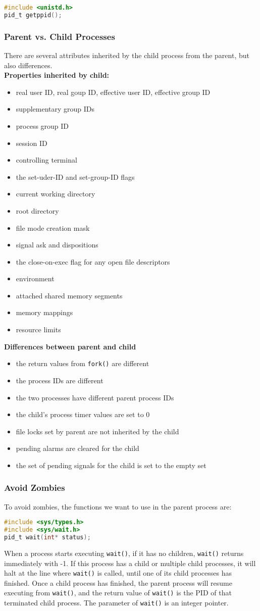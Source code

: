 \documentclass{article}
\newcommand{\bold}[1]{\textbf{#1}}
\renewcommand{\b}{\item[$\circ$]}
\newcommand{\newlist}{\begin{itemize}}
\renewcommand{\endlist}{\end{itemize}}
\newcommand{\code}[1]{\texttt{#1}}
\begin{document}
\begin{lstlisting}[language=c]
#include <unistd.h>
pid_t getppid();
\end{lstlisting}

\subsubsection{Parent vs. Child Processes}

There are several attributes inherited by the child process from the parent, but also differences. \\

\bold{Properties inherited by child:}

\newlist
\b real user ID, real goup ID, effective user ID, effective group ID
\b supplementary group IDs
\b process group ID
\b session ID
\b controlling terminal
\b the set-uder-ID and set-group-ID flags
\b current working directory
\b root directory
\b file mode creation mask
\b signal ask and dispositions
\b the close-on-exec flag for any open file descriptors
\b environment
\b attached shared memory segments
\b memory mappings
\b resource limits
\endlist

\bold{Differences between parent and child}

\newlist
\b the return values from \code{fork()} are different
\b the process IDs are different
\b the two processes have different parent process IDs
\b the child's process timer values are set to 0
\b file locks set by parent are not inherited by the child
\b pending alarms are cleared for the child
\b the set of pending signals for the child is set to the empty set
\endlist

\subsubsection{Avoid Zombies}

To avoid zombies, the functions we want to use in the parent process are:

\begin{lstlisting}[language=c]
#include <sys/types.h>
#include <sys/wait.h>
pid_t wait(int* status);
\end{lstlisting}

When a process starts executing \code{wait()}, if it has no children, \code{wait()} returns immediately with -1. If this process has a child or multiple child processes, it will halt at the line where \code{wait()} is called, until one of its child processes has finished. Once a child process has finished, the parent process will resume executing from \code{wait()}, and the return value of \code{wait()} is the PID of that terminated child process. The parameter of \code{wait()} is an integer pointer. 
\end{document}
